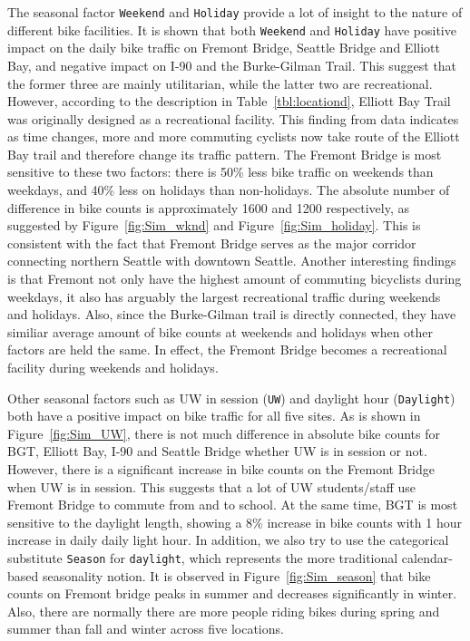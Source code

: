 \documentclass [11pt, proquest] {uwthesis}[2015/03/03]
\begin{document}
The seasonal factor \texttt{Weekend} and \texttt{Holiday} provide a lot of insight to the nature of different bike facilities. It is shown that both \texttt{Weekend} and \texttt{Holiday} have positive impact on the daily bike traffic on Fremont Bridge, Seattle Bridge and Elliott Bay, and negative impact on I-90 and the Burke-Gilman Trail. This suggest that the former three are mainly utilitarian, while the latter two are recreational. However, according to the description in Table~\ref{tbl:locationd}, Elliott Bay Trail was originally designed as a recreational facility. This finding from data indicates as time changes, more and more commuting cyclists now take route of the Elliott Bay trail and therefore change its traffic pattern. The Fremont Bridge is most sensitive to these two factors: there is 50\% less bike traffic on weekends than weekdays, and 40\% less on holidays than non-holidays. The absolute number of difference in bike counts is approximately 1600 and 1200 respectively, as suggested by Figure~\ref{fig:Sim_wknd} and Figure~\ref{fig:Sim_holiday}. This is consistent with the fact that Fremont Bridge serves as the major corridor connecting northern Seattle with downtown Seattle. Another interesting findings is that Fremont not only have the highest amount of commuting bicyclists during weekdays, it also has arguably the largest recreational traffic during weekends and holidays. Also, since the Burke-Gilman trail is directly connected, they have similiar average amount of bike counts at weekends and holidays when other factors are held the same. In effect, the Fremont Bridge becomes a recreational facility during weekends and holidays. 

Other seasonal factors such as UW in session (\texttt{UW}) and daylight hour (\texttt{Daylight}) both have a positive impact on bike traffic for all five sites. As is shown in Figure~\ref{fig:Sim_UW}, there is not much difference in absolute bike counts for BGT, Elliott Bay, I-90 and Seattle Bridge whether UW is in session or not. However, there is a significant increase in bike counts on the Fremont Bridge when UW is in session. This suggests that a lot of UW students/staff use Fremont Bridge to commute from and to school. At the same time, BGT is most sensitive to the daylight length, showing a 8\% increase in bike counts with 1 hour increase in daily daily light hour. In addition, we also try to use the categorical substitute \texttt{Season} for \texttt{daylight}, which represents the more traditional calendar-based seasonality notion. It is observed in Figure~\ref{fig:Sim_season} that bike counts on Fremont bridge peaks in summer and decreases significantly in winter. Also, there are normally there are more people riding bikes during spring and summer than fall and winter across five locations. 
\end{document}
